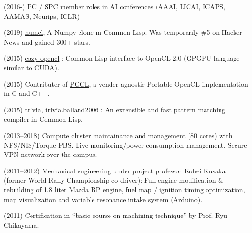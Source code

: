 (2016-) PC / SPC member roles in AI conferences (AAAI, IJCAI, ICAPS, AAMAS, Neurips, ICLR)

(2019) \href{https://github.com/numcl/numcl}{numcl},
A Numpy clone in Common Lisp. Was temporarily \#5 on Hacker News and gained 300+ stars.

(2015) \href{https://github.com/guicho271828/eazy-opencl}{eazy-opencl}
: Common Lisp interface to OpenCL 2.0 (GPGPU language similar to CUDA).

(2015) Contributer of \href{https://github.com/pocl/pocl}{POCL},
a vender-agnostic Portable OpenCL implementation in C and C++.

(2015) \href{https://github.com/guicho271828/trivia}{trivia},
\href{https://github.com/guicho271828/trivia.balland2006}{trivia.balland2006}
: An extensible and fast pattern matching compiler in Common Lisp.


(2013--2018)
 Compute cluster maintainance and management (80 cores) with NFS/NIS/Torque-PBS.
 Live monitoring/power consumption management.
 Secure VPN network over the campus.

(2011--2012) Mechanical engineering under project professor Kohei Kusaka (former World Rally
 Championship co-driver):
 Full engine modification \& rebuilding of 1.8 liter Mazda BP engine,
 fuel map / ignition timing optimization, map visualization and
 variable resonance intake system (Arduino).

(2011) Certification in ``basic course on machining technique'' by Prof. Ryu Chikayama.




